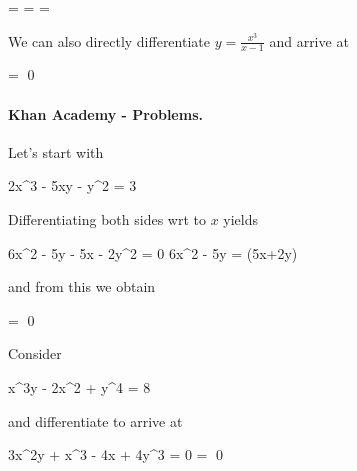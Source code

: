 \bee
{} =  =  = 
\eee

We can also directly differentiate $y = \frac{x^3}{x-1}$ and arrive at

\bee
{} =  \qed
\eee

\paragraph{Khan Academy - Problems.} Let's start with

\bee
2x^3 - 5xy - y^2 = 3
\eee

Differentiating both sides wrt to $x$ yields

\bee
6x^2 - 5y - 5x  - 2y^2  = 0 \rightarrow 6x^2 - 5y = (5x+2y) 
\eee

and from this we obtain

\bee
{} =  \qed
\eee

Consider 

\bee
x^3y - 2x^2 + y^4 = 8
\eee

and differentiate to arrive at

\bee
3x^2y + x^3  - 4x + 4y^3  = 0 \rightarrow {} =  \qed
\eee